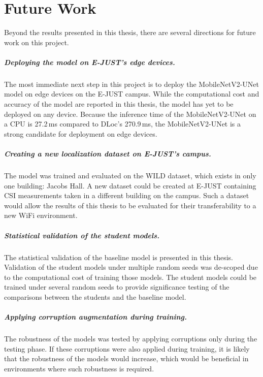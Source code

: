 \chapter{Future Work}
\label{ch:futurework}

Beyond the results presented in this thesis, there are several directions for future work on this
project.

\paragraph{Deploying the model on E-JUST's edge devices.} The most immediate next step in this project is
to deploy the MobileNetV2-UNet model on edge devices on the E-JUST campus. While the computational cost
and accuracy of the model are reported in this thesis, the model has yet to be deployed on any device.
Because the inference time of the MobileNetV2-UNet on a CPU is 27.2\,ms compared to DLoc's 270.9\,ms, the
MobileNetV2-UNet is a strong candidate for deployment on edge devices.

\paragraph{Creating a new localization dataset on E-JUST's campus.} The model was trained and evaluated
on the WILD dataset, which exists in only one building: Jacobs Hall. A new dataset could be created at
E-JUST containing CSI measurements taken in a different building on the campus. Such a dataset would allow
the results of this thesis to be evaluated for their transferability to a new WiFi environment.

\paragraph{Statistical validation of the student models.} The statistical validation of the baseline
model is presented in this thesis. Validation of the student models under multiple random seeds was
de-scoped due to the computational cost of training those models. The student models could be trained
under several random seeds to provide significance testing of the comparisons between the students and the
baseline model.

\paragraph{Applying corruption augmentation during training.} The robustness of the models was tested by
applying corruptions only during the testing phase. If these corruptions were also applied during
training, it is likely that the robustness of the models would increase, which would be beneficial in
environments where such robustness is required.

